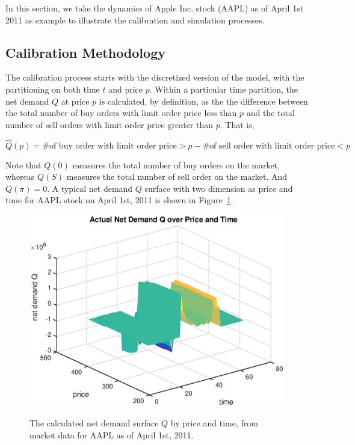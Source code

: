\documentclass{article}
\begin{document}
In this section, we take the dynamics of Apple Inc. stock (AAPL) as of April 1st 2011 as example to illustrate the calibration and simulation processes.

\subsection{Calibration Methodology}
The calibration process starts with the discretized version of the model, with the partitioning on both time $t$ and price $p$. Within a particular time partition, the net demand $Q$ at price $p$ is calculated, by definition, as the the difference between the total number of buy orders with limit order price less than $p$ and the total number of sell orders with limit order price greater than $p$. That is,

$$
\hat{Q}(p) = \# \textrm{of buy order with limit order price} > p - \# \textrm{of sell order with limit order price} < p
$$

Note that $Q(0)$ measures the total number of buy orders on the market, whereas $Q(S)$ measures the total number of sell order on the market. And $Q(\pi) = 0$. A typical net demand $Q$ surface with two dimension as price and time for AAPL stock on April 1st, 2011 is shown in Figure~\ref{fig::AAPL_20110401_Calibration_Q}.

\begin{center}
\begin{figure}
  \centering
  \includegraphics[scale = 0.7]{AAPL_20110401_Calibration_Q.eps}\\
  \caption{The calculated net demand surface $Q$ by price and time, from market data for AAPL as of April 1st, 2011.}\label{fig::AAPL_20110401_Calibration_Q}
\end{figure}
\end{center}
\end{document}
